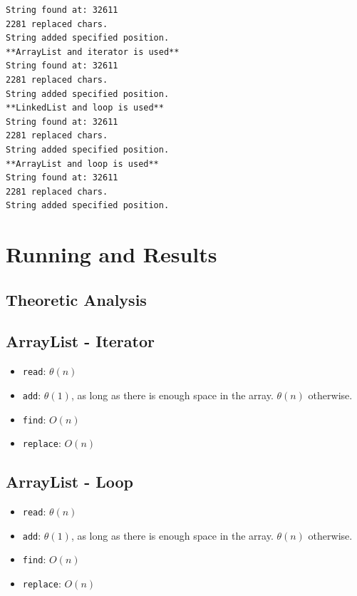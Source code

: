 \documentclass[a4paper]{article}
\begin{document}
\begin{large}
\begin{lstlisting}[language=Java]
\end{lstlisting}

\begin{small}
\begin{verbatim}
String found at: 32611
2281 replaced chars.
String added specified position.
**ArrayList and iterator is used**
String found at: 32611
2281 replaced chars.
String added specified position.
**LinkedList and loop is used**
String found at: 32611
2281 replaced chars.
String added specified position.
**ArrayList and loop is used**
String found at: 32611
2281 replaced chars.
String added specified position.
\end{verbatim}
\end{small}

\newpage

\section{Running and Results}

\subsection{Theoretic Analysis}

\subsection*{ArrayList - Iterator}
\begin{itemize}
  \item \texttt{read}: $\theta(n)$
  \item \texttt{add}: $\theta(1)$, as long as there is enough space in the array. $\theta(n)$ otherwise.
  \item \texttt{find}: $O(n)$
  \item \texttt{replace}: $O(n)$
\end{itemize}

\subsection*{ArrayList - Loop}
\begin{itemize}
  \item \texttt{read}: $\theta(n)$
  \item \texttt{add}: $\theta(1)$, as long as there is enough space in the array. $\theta(n)$ otherwise.
  \item \texttt{find}: $O(n)$
  \item \texttt{replace}: $O(n)$
\end{itemize}


\end{large}
\end{document}
